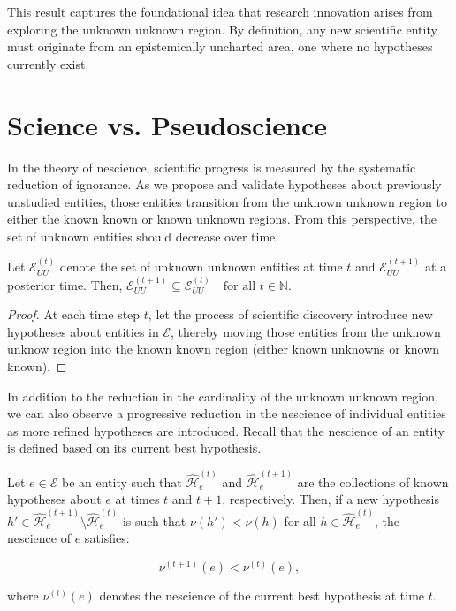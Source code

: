 This result captures the foundational idea that research innovation arises from exploring the unknown unknown region. By definition, any new scientific entity must originate from an epistemically uncharted area, one where no hypotheses currently exist.

%
%

\section{Science vs. Pseudoscience}

In the theory of nescience, scientific progress is measured by the systematic reduction of ignorance. As we propose and validate hypotheses about previously unstudied entities, those entities transition from the unknown unknown region to either the known known or known unknown regions. From this perspective, the set of unknown entities should decrease over time.

\begin{proposition}
Let $\mathcal{E}^{(t)}_{UU}$ denote the set of unknown unknown entities at time $t$ and $\mathcal{E}^{(t+1)}_{UU}$ at a posterior time. Then, $\mathcal{E}^{(t+1)}_{UU} \subseteq \mathcal{E}^{(t)}_{UU} \quad \text{for all } t \in \mathbb{N}$.
\end{proposition}
\begin{proof}
At each time step $t$, let the process of scientific discovery introduce new hypotheses about entities in $\mathcal{E}$, thereby moving those entities from the unknown unknow region into the known known region (either known unknowns or known known).
\end{proof}

In addition to the reduction in the cardinality of the unknown unknown region, we can also observe a progressive reduction in the nescience of individual entities as more refined hypotheses are introduced. Recall that the nescience of an entity is defined based on its current best hypothesis.

\begin{proposition}
Let $e \in \mathcal{E}$ be an entity such that $\hat{\mathcal{H}}^{(t)}_e$ and $\hat{\mathcal{H}}^{(t+1)}_e$ are the collections of known hypotheses about $e$ at times $t$ and $t+1$, respectively. Then, if a new hypothesis $h' \in \hat{\mathcal{H}}^{(t+1)}_e \setminus \hat{\mathcal{H}}^{(t)}_e$ is such that $\nu(h') < \nu(h)$ for all $h \in \hat{\mathcal{H}}^{(t)}_e$, the nescience of $e$ satisfies:

$$
\nu^{(t+1)}(e) < \nu^{(t)}(e),
$$

where $\nu^{(t)}(e)$ denotes the nescience of the current best hypothesis at time $t$.
\end{proposition}

